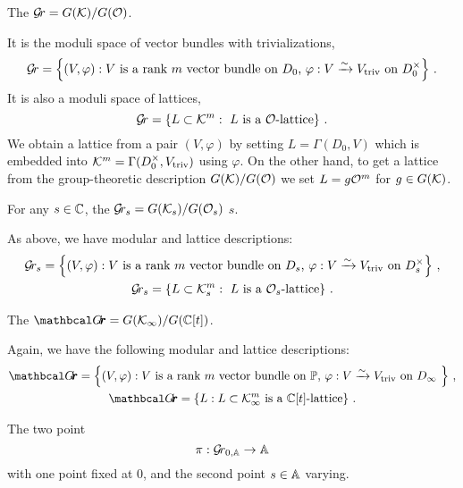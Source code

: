 \documentclass{article}
\begin{document}
\begin{definition}\label{def:gr}
     The  \(\Gr = G(\cK)/G(\cO)\).
\end{definition}    
It is the moduli space of vector bundles with trivializations,
\[
\Gr = 
    \left \{ 
        (V, \varphi) : \text{\(V\) is a rank \(m\) vector bundle on \( D_0 \), \(\varphi : V \xrightarrow{\sim} \Vtriv \) on \( D_0^\times \)} 
    \right \} \,. 
\]
It is also a moduli space of lattices, 
\[ 
\Gr = 
    \left\{ L \subset \cK^m : \text{ \(L\) is a \(\cO\)-lattice} \right\}\,.
\]
We obtain a lattice from a pair \( (V,\varphi) \) by setting \( L = \Gamma(D_0, V)\) which is embedded into \( \cK^m = \Gamma(D_0^\times, \Vtriv)\) using \( \varphi\).  
On the other hand, to get a lattice from the group-theoretic description \( G(\cK) / G(\cO) \) we set \( L = g \cO^m\) for \( g \in G(\cK)\).
% 
\begin{definition}\label{def:grs}
    For any \( s \in \CC \), the  \(\Gr_s = G(\cK_s)/G(\cO_s)\)  \( s \). 
\end{definition}  
% 
As above, we have modular and lattice descriptions:
% 
\begin{gather*}
\Gr_s = 
    \left\{ (
        V, \varphi) : \text{\(V\) is a rank \(m\) vector bundle on \( D_s \), \(\varphi : V \xrightarrow{\sim} \Vtriv \) on \( D^\times_s \)} 
    \right\}\,, \\
\Gr_s = 
    \left\{ 
        L \subset \cK_s^m : \text{ \(L\) is a \(\cO_s\)-lattice} 
    \right\} \,. 
\end{gather*}
% 
\begin{definition}\label{def:grth}
    The  \(\Grth = G(\Kinf)/G(\CC[t])\).
\end{definition}
Again, we have the following modular and lattice descriptions:
\begin{gather*}
\Grth = 
    \left\{ 
        (V, \varphi) : \text{\(V\) is a rank \(m\) vector bundle on \( \PP \), \(\varphi : V \xrightarrow{\sim} \Vtriv \) on \( D_\infty \) } 
    \right\}\,, \\
\Grth = 
    \left\{ 
        L : L \subset  \Kinf^m \text{ is a \(\CC[t]\)-lattice} 
    \right\}\,.
\end{gather*}
% 
\begin{definition}\label{def:bdgr}
    The two point  \[\pi : \Grbd\to \AA\] with one point fixed at 0, and the second point \(s\in\AA\) varying.
\end{definition}
\end{document}
